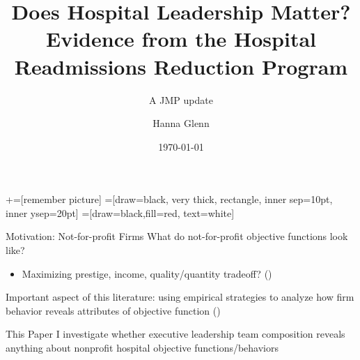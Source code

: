 \documentclass[notes,11pt, aspectratio=169]{beamer}
\title[]{\textcolor{sage}{Does Hospital Leadership Matter? Evidence from the Hospital Readmissions Reduction Program}}
\subtitle[]{A JMP update}
\author[]{Hanna Glenn}
\date{\today}
\begin{document}
\newcommand\marktopleft[1]{%
    \tikz[overlay,remember picture] 
        \node (marker-#1-a) at (-.3em,.3em) {};%
}
\newcommand\markbottomright[2]{%
    \tikz[overlay,remember picture] 
        \node (marker-#1-b) at (0em,0em) {};%
}
+=[remember picture] 
 =[draw=black, very thick, rectangle, inner sep=10pt, inner ysep=20pt]
 =[draw=black,fill=red, text=white]

\begin{frame}
\maketitle
\end{frame}

\begin{frame}{Motivation: Not-for-profit Firms}
    What do not-for-profit objective functions look like?
    \begin{itemize}
        \item Maximizing prestige, income, quality/quantity tradeoff?  (\cite{steinberg1986revealed})
    \end{itemize}

    \vspace{3mm}

    Important aspect of this literature: using empirical strategies to analyze how firm behavior reveals attributes of objective function (\cite{sloan2000not})

    \vspace{10mm} \pause

    \begin{block}{This Paper}
    I investigate whether executive leadership team composition reveals anything about nonprofit hospital objective functions/behaviors
    \end{block}
\end{frame}
\end{document}
